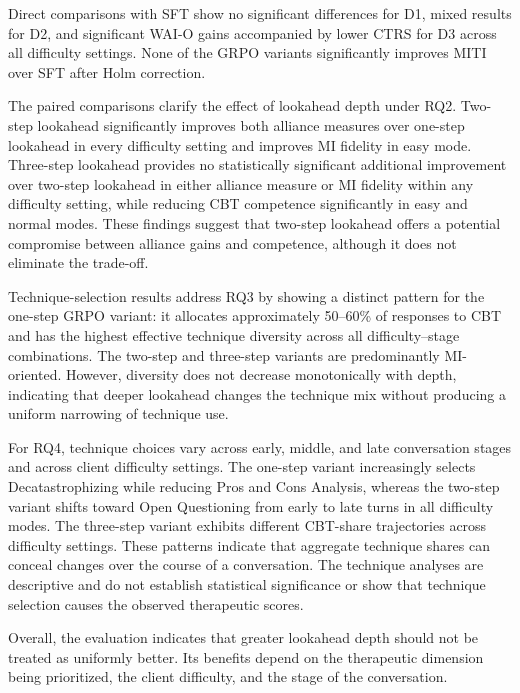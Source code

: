 Direct comparisons with SFT show no significant differences for D1, mixed results for D2, and significant WAI-O gains accompanied by lower CTRS for D3 across all difficulty settings. None of the GRPO variants significantly improves MITI over SFT after Holm correction.

The paired comparisons clarify the effect of lookahead depth under RQ2. Two-step lookahead significantly improves both alliance measures over one-step lookahead in every difficulty setting and improves MI fidelity in easy mode. Three-step lookahead provides no statistically significant additional improvement over two-step lookahead in either alliance measure or MI fidelity within any difficulty setting, while reducing CBT competence significantly in easy and normal modes. These findings suggest that two-step lookahead offers a potential compromise between alliance gains and competence, although it does not eliminate the trade-off.

Technique-selection results address RQ3 by showing a distinct pattern for the one-step GRPO variant: it allocates approximately 50--60\% of responses to CBT and has the highest effective technique diversity across all difficulty--stage combinations. The two-step and three-step variants are predominantly MI-oriented. However, diversity does not decrease monotonically with depth, indicating that deeper lookahead changes the technique mix without producing a uniform narrowing of technique use.

For RQ4, technique choices vary across early, middle, and late conversation stages and across client difficulty settings. The one-step variant increasingly selects Decatastrophizing while reducing Pros and Cons Analysis, whereas the two-step variant shifts toward Open Questioning from early to late turns in all difficulty modes. The three-step variant exhibits different CBT-share trajectories across difficulty settings. These patterns indicate that aggregate technique shares can conceal changes over the course of a conversation. The technique analyses are descriptive and do not establish statistical significance or show that technique selection causes the observed therapeutic scores.

Overall, the evaluation indicates that greater lookahead depth should not be treated as uniformly better. Its benefits depend on the therapeutic dimension being prioritized, the client difficulty, and the stage of the conversation.
